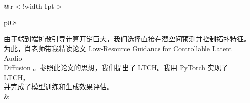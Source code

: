 \documentclass{article}
\newcommand{\foo}{\color{coverlinecolor}\makebox[0pt]{\textbullet}\hskip-0.5pt\vrule width 1pt\hspace{\labelsep}}
\begin{document}
\begin{table}[htbp!]
\begin{tabular}[t]{@{\,}r <{\hskip 2pt} !{\foo} >{\raggedright\arraybackslash}p{0.8\linewidth}}
{    由于端到端扩散引导计算开销巨大，我们选择直接在潜空间预测并控制拓扑特征。\\
    为此，肖老师带我精读论文 Low-Resource Guidance for Controllable Latent Audio\\ Diffusion \cite{novack2026}。参照此论文的思想，我们提出了 LTCH。我用 PyTorch 实现了 LTCH，\\
    并完成了模型训练和生成效果评估。
    }\\
     & \\
  \end{tabular}
\end{table}
\end{document}
